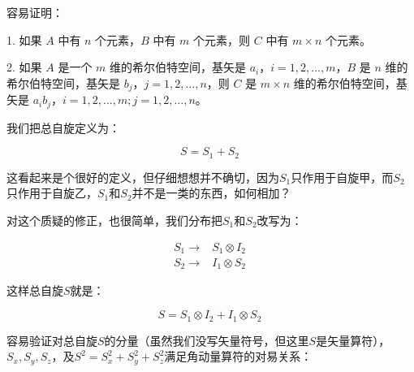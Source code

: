 容易证明：

1. 如果 $A$ 中有 $n$ 个元素，$B$ 中有 $m$ 个元素，则 $C$ 中有 $m \times n$ 个元素。

2. 如果 $A$ 是一个 $m$ 维的希尔伯特空间，基矢是 ${a_i}$，$i=1,2,\ldots,m$，$B$ 是 $n$ 维的希尔伯特空间，基矢是 ${b_j}$，$j=1,2,\ldots,n$，则 $C$ 是 $m \times n$ 维的希尔伯特空间，基矢是 ${a_i b_j}$，$i=1,2,\ldots,m; j=1,2,\ldots,n$。

我们把总自旋定义为：

\begin{equation}
S= S_1 + S_2~
\end{equation}

这看起来是个很好的定义，但仔细想想并不确切，因为$S_1$只作用于自旋甲，而$S_2$只作用于自旋乙，$S_1$和$S_2$并不是一类的东西，如何相加？

对这个质疑的修正，也很简单，我们分布把$S_1$和$S_2$改写为：

\begin{align}
S_1  \to & S_1 \otimes  I_2 \\
S_2  \to & I_1 \otimes S_2~
\end{align}

这样总自旋$S$就是：

\begin{equation}
S= S_1 \otimes I_2 +  I_1 \otimes S_2~
\end{equation}

容易验证对总自旋$S$的分量（虽然我们没写矢量符号，但这里$S$是矢量算符），$S_x, S_y, S_z$，及$S^2 = S_x^2 + S_y^2 + S_z^2$满足角动量算符的对易关系：

